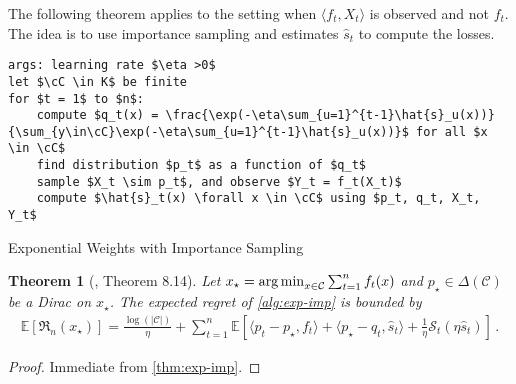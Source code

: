 \documentclass{article}
\theoremstyle{plain}
\newtheorem{theorem}{Theorem}
\theoremstyle{definition}
\theoremstyle{remark}
\newcommand{\argmin}{\operatornamewithlimits{arg\,min}}
\newcommand{\Reg}{\mathfrak{R}}
\newcommand{\E}{\mathbb E}
\newcommand{\cS}{\mathcal S}
\newcommand{\cC}{\mathcal C}
\theoremstyle{definition}
\begin{document}
The following theorem applies to the setting when $\langle f_t, X_t \rangle$ is observed and not $f_t$.
The idea is to use importance sampling and estimates $\hat{s}_t$ to compute the losses.
\begin{algorithm}[h!]
    \begin{minipage}{12cm}
        \begin{mdframed}
            \begin{lstlisting}
args: learning rate $\eta >0$
let $\cC \in K$ be finite
for $t = 1$ to $n$:
    compute $q_t(x) = \frac{\exp(-\eta\sum_{u=1}^{t-1}\hat{s}_u(x))}{\sum_{y\in\cC}\exp(-\eta\sum_{u=1}^{t-1}\hat{s}_u(x))}$ for all $x \in \cC$
    find distribution $p_t$ as a function of $q_t$
    sample $X_t \sim p_t$, and observe $Y_t = f_t(X_t)$
    compute $\hat{s}_t(x) \forall x \in \cC$ using $p_t, q_t, X_t, Y_t$
\end{lstlisting}
            \caption{Exponential Weights with Importance Sampling}\label{alg:exp-imp}
        \end{mdframed}
    \end{minipage}
\end{algorithm}

\begin{theorem}[\cite{lattimore2024bandit}, Theorem 8.14]
    \label{thm:exp-imp-regret}
    Let $x_\star = \argmin_{x \in \cC} \sum_{t=1}^{n} f_t(x)$ and
    $p_\star \in \Delta(\cC)$ be a Dirac on $x_\star$.
    The expected regret of \cref{alg:exp-imp} is bounded by
    \begin{align*}
        \E\left[
            \Reg_n(x_\star)
            \right]
        = \frac{\log(|\cC|)}{\eta} +
        \sum_{t=1}^{n} \E\left[
            \langle p_t - p_\star, f_t \rangle
            + \langle p_\star - q_t, \hat{s}_t \rangle
            + \frac{1}{\eta} \cS_t(\eta \hat{s}_t)
            \right]\,.
    \end{align*}
\end{theorem}
\begin{proof}
    Immediate from \cref{thm:exp-imp}.
\end{proof}
\end{document}

